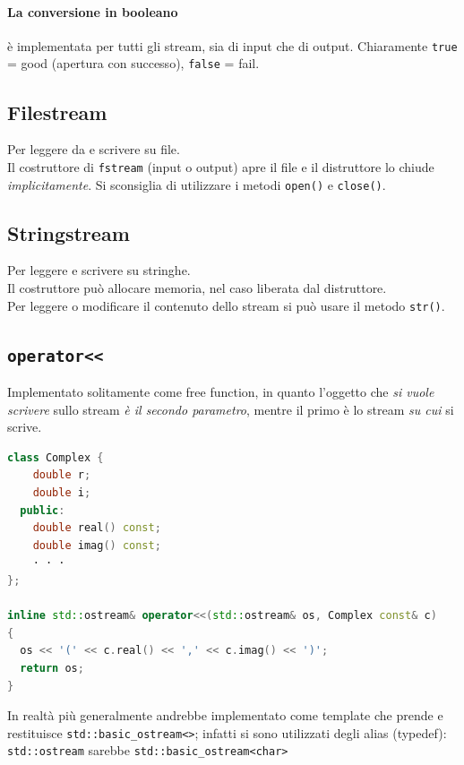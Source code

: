 \documentclass[10pt, oneside]{book}
\begin{document}
\paragraph{La conversione in booleano} è implementata per tutti gli stream, sia di input che di output. Chiaramente \texttt{true} = good (apertura con successo), \texttt{false} = fail.

\subsection{Filestream}
Per leggere da e scrivere su file.\\
Il costruttore di \texttt{fstream} (input o output) apre il file e il distruttore lo chiude \textit{implicitamente}. Si sconsiglia di utilizzare i metodi \texttt{open()} e \texttt{close()}.

\subsection{Stringstream}
Per leggere e scrivere su stringhe.\\
Il costruttore può allocare memoria, nel caso liberata dal distruttore.\\
Per leggere o modificare il contenuto dello stream si può usare il metodo \texttt{str()}.

\subsection{\texttt{operator<<}}
Implementato solitamente come free function, in quanto l'oggetto che \textit{si vuole scrivere} sullo stream \textit{è il secondo parametro}, mentre il primo è lo stream \textit{su cui} si scrive.
\begin{lstlisting}[language=C++]
class Complex {
    double r;
    double i;
  public:
    double real() const;
    double imag() const;
    · · ·
};

inline std::ostream& operator<<(std::ostream& os, Complex const& c)
{
  os << '(' << c.real() << ',' << c.imag() << ')';
  return os;
}
\end{lstlisting}
In realtà più generalmente andrebbe implementato come template che prende e restituisce \texttt{std::basic\_ostream<>}; infatti si sono utilizzati degli alias (typedef): \texttt{std::ostream} sarebbe \texttt{std::basic\_ostream<char>}
\end{document}
